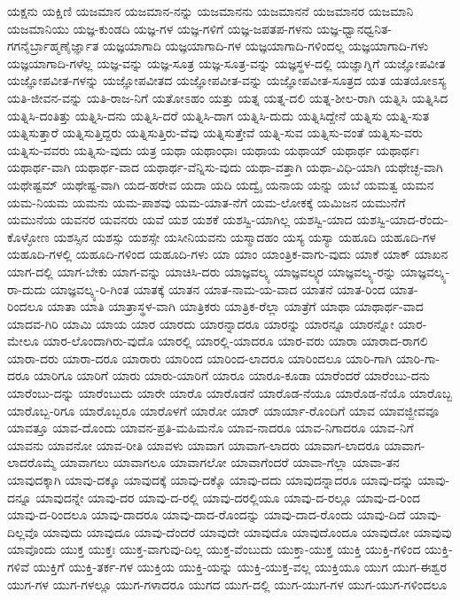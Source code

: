 {ಯಕ್ಷನು
ಯಕ್ಷಿಣಿ
ಯಜಮಾನ
ಯಜಮಾನ-ನನ್ನು
ಯಜಮಾನನು
ಯಜಮಾನನೆ
ಯಜಮಾನರ
ಯಜಮಾನಿ
ಯಜಮಾನಿಯು
ಯಜ್ಞ-ಕುಂಡದಿ
ಯಜ್ಞ-ಗಳ
ಯಜ್ಞ-ಗಳಿಗೆ
ಯಜ್ಞ-ಜಪತಪ-ಗಳನು
ಯಜ್ಞ-ಧ್ವಾನಧ್ವನಿತ-ಗಗನೈರ್ಬ್ರಾಹ್ಮಣೈರ್ಜ್ಞಾತ
ಯಜ್ಞಯಾಗಾದಿ
ಯಜ್ಞಯಾಗಾದಿ-ಗಳ
ಯಜ್ಞಯಾಗಾದಿ-ಗಳಿಂದಲ್ಲ
ಯಜ್ಞಯಾಗಾದಿ-ಗಳು
ಯಜ್ಞಯಾಗಾದಿ-ಗಳೆಲ್ಲ
ಯಜ್ಞ-ವನ್ನು
ಯಜ್ಞ-ಸೂತ್ರ
ಯಜ್ಞ-ಸೂತ್ರ-ವನ್ನು
ಯಜ್ಞಸ್ಥಳ-ದಲ್ಲಿ
ಯಜ್ಞಾಗ್ನಿಗೆ
ಯಜ್ಞೋಪವೀತ
ಯಜ್ಞೋಪವೀತ-ಗಳನ್ನು
ಯಜ್ಞೋಪವೀತದ
ಯಜ್ಞೋಪವೀತ-ವನ್ನು
ಯಜ್ಞೋಪವೀತ-ಸೂತ್ರದ
ಯತ
ಯತಯೋಽಸ್ಯ
ಯತಿ-ಜೀವನ-ವನ್ನು
ಯತಿ-ರಾಜ-ನಿಗೆ
ಯತೋಽಹಂ
ಯತ್ತು
ಯತ್ನ
ಯತ್ನ-ದಲಿ
ಯತ್ನ-ಶೀಲ-ರಾಗಿ
ಯತ್ನಿಸಿ
ಯತ್ನಿಸಿದ
ಯತ್ನಿಸಿ-ದಂತಿತ್ತು
ಯತ್ನಿಸಿ-ದನು
ಯತ್ನಿಸಿ-ದರೆ
ಯತ್ನಿಸಿ-ದಾಗ
ಯತ್ನಿಸಿ-ದುದು
ಯತ್ನಿಸಿದ್ದೇನೆ
ಯತ್ನಿಸು
ಯತ್ನಿ-ಸುತ
ಯತ್ನಿಸುತ್ತಾರೆ
ಯತ್ನಿಸುತ್ತಿದ್ದರು
ಯತ್ನಿಸುತ್ತಿರು-ವೆವು
ಯತ್ನಿಸುತ್ತೇವೆ
ಯತ್ನಿ-ಸುವ
ಯತ್ನಿಸು-ವಂತೆ
ಯತ್ನಿಸು-ವರು
ಯತ್ನಿಸು-ವವರು
ಯತ್ನಿಸು-ವುದು
ಯತ್ರ
ಯಥಾ
ಯಥಾಂಧಾಃ
ಯಥಾಯ
ಯಥಾಯ್
ಯಥಾರ್ಥ
ಯಥಾರ್ಥಃ
ಯಥಾರ್ಥ-ವಾಗಿ
ಯಥಾರ್ಥ-ವಾದ
ಯಥಾರ್ಥ-ವೆನ್ನಿಸು-ವುದು
ಯಥಾ-ವತ್ತಾಗಿ
ಯಥಾ-ವಿಧಿ-ಯಾಗಿ
ಯಥೇಚ್ಛ-ವಾಗಿ
ಯಥೇಷ್ಟಮ್
ಯಥೇಷ್ಟ-ವಾಗಿ
ಯದ-ಹರೇವ
ಯದಾ
ಯದಿ
ಯದ್ವೈ
ಯನಾಯ
ಯನ್ನು
ಯಬೆ
ಯಮತ್ವ
ಯಮನ
ಯಮ-ನಿಯಮ
ಯಮನು
ಯಮ-ಪಾಶವು
ಯಮ-ಯಾತ-ನೆಗೆ
ಯಮ-ಲೋಕಕ್ಕೆ
ಯಮಿಜನ
ಯಮುನೆಗೆ
ಯಮುನೆಯ
ಯವನರ
ಯವನರು
ಯವೆ
ಯಶ
ಯಶಕೆ
ಯಶಸ್ವಿ-ಯಾಗಿಲ್ಲ
ಯಶಸ್ವಿ-ಯಾದ
ಯಶಸ್ವಿ-ಯಾದ-ರೆಂದು-ಕೊಳ್ಳೋಣ
ಯಶಸ್ಸಿನ
ಯಶಸ್ಸು
ಯಶಸ್ಸೇ
ಯಸೀನಿಯವನು
ಯಸ್ಮಾದಹಂ
ಯಸ್ಯ
ಯಸ್ಯಾ
ಯಹೂದಿ
ಯಹೂದಿ-ಗಳ
ಯಹೂದಿ-ಗಳಲ್ಲಿ
ಯಹೂದಿ-ಗಳಿಂದ
ಯಹೂದಿ-ಗಳು
ಯಾ
ಯಾಂ
ಯಾಂತ್ರಿಕ-ವಾಗು-ವುದು
ಯಾಕೆ
ಯಾಕ್
ಯಾಖನ
ಯಾಗ-ದಲ್ಲಿ
ಯಾಗ-ಬೇಕು
ಯಾಗ-ವನ್ನು
ಯಾಚಿಸಿ-ದರು
ಯಾಜ್ಞವಲ್ಕ್ಯ
ಯಾಜ್ಞವಲ್ಕ್ಯರ
ಯಾಜ್ಞವಲ್ಕ್ಯ-ರನ್ನು
ಯಾಜ್ಞವಲ್ಕ್ಯ-ರಾ-ದುದು
ಯಾಜ್ಞವಲ್ಕ್ಯ-ರಿ-ಗಿಂತ
ಯಾತಕ್ಕೆ
ಯಾತನ
ಯಾತ-ನಾಮ-ಯ-ವಾದ
ಯಾತನೆ
ಯಾತ-ರಿಂದ
ಯಾತ-ರಿಂದಲೂ
ಯಾತಾ
ಯಾತಿ
ಯಾತ್ರಾಸ್ಥಳ-ವಾಗಿ
ಯಾತ್ರಿಕರು
ಯಾತ್ರಿಕ-ರೆಲ್ಲಾ
ಯಾತ್ರೆಗೆ
ಯಾಥಾ
ಯಾಥಾರ್ಥ-ವಾದ
ಯಾದವ-ಗಿರಿ
ಯಾಮಿ
ಯಾಯ
ಯಾರ
ಯಾರದು
ಯಾರನ್ನಾದರೂ
ಯಾರನ್ನು
ಯಾರನ್ನೂ
ಯಾರನ್ನೋ
ಯಾರ-ಮೇಲೂ
ಯಾರ-ಲೊಂದಾಗಿರು-ವುದೊ
ಯಾರಲ್ಲಿ
ಯಾರಲ್ಲಿ-ಯಾದರೂ
ಯಾರ-ವರು
ಯಾರಾ
ಯಾರಾದ-ರಾಗಲಿ
ಯಾರಾ-ದರು
ಯಾರಾ-ದರೂ
ಯಾರಾರು
ಯಾರಿಂದ
ಯಾರಿಂದ-ಲಾದರೂ
ಯಾರಿಂದಲೂ
ಯಾರಿ-ಗಾಗಿ
ಯಾರಿ-ಗಾ-ದರೂ
ಯಾರಿಗೂ
ಯಾರಿಗೆ
ಯಾರು
ಯಾರು-ಯಾರಿಗೆ
ಯಾರೂ
ಯಾರೂ-ಕೂಡಾ
ಯಾರೆಂದರೆ
ಯಾರೆಂಬು-ದನು
ಯಾರೆಂಬು-ದನ್ನು
ಯಾರೆಂಬುದು
ಯಾರೇ
ಯಾರೊ
ಯಾರೊಡನೆ
ಯಾರೊಡ-ನೆಯೂ
ಯಾರೊಡ-ನೆಯೊ
ಯಾರೊಬ್ಬ
ಯಾರೊಬ್ಬ-ರಿಗೂ
ಯಾರೊಬ್ಬರೂ
ಯಾರೊಳಗೆ
ಯಾರೋ
ಯಾರ್
ಯಾರ್ಯಾ-ರೊಂದಿಗೆ
ಯಾವ
ಯಾವಜ್ಜೀವವೂ
ಯಾವತ್ತೂ
ಯಾವ-ದೊಂದು
ಯಾವನ-ಪ್ರತಿ-ಮಹಿಮನೊ
ಯಾವ-ನಾದರೂ
ಯಾವ-ನಿಗಾದರೂ
ಯಾವ-ನಿಗೆ
ಯಾವನು
ಯಾವನೋ
ಯಾವ-ರೀತಿ
ಯಾವಳು
ಯಾವಾಗ
ಯಾವಾಗ-ಲಾದರು
ಯಾವಾಗ-ಲಾದರೂ
ಯಾವಾಗ-ಲಾದರೊಮ್ಮೆ
ಯಾವಾಗಲು
ಯಾವಾಗಲೂ
ಯಾವಾಗಲೋ
ಯಾವಾಗೆಂದರೆ
ಯಾವಾ-ಗೆಲ್ಲಾ
ಯಾವಾ-ತನ
ಯಾವುದಕ್ಕಾಗಿ
ಯಾವು-ದಕ್ಕೂ
ಯಾವುದಕ್ಕೆ
ಯಾವು-ದಕ್ಕೊ
ಯಾವು-ದದು
ಯಾವುದನ್ನಾದರೂ
ಯಾವು-ದನ್ನು
ಯಾವು-ದನ್ನೂ
ಯಾವುದನ್ನೇ
ಯಾವು-ದರ
ಯಾವು-ದ-ರಲ್ಲಿ
ಯಾವು-ದರಲ್ಲಿಯೂ
ಯಾವು-ದ-ರಲ್ಲೂ
ಯಾವು-ದ-ರಿಂದ
ಯಾವು-ದ-ರಿಂದಲೂ
ಯಾವು-ದಾದರೂ
ಯಾವು-ದಾದ-ರೊಂದನ್ನು
ಯಾವು-ದಾದ-ರೊಂದು
ಯಾವು-ದಿದೆ
ಯಾವು-ದಿಲ್ಲವೊ
ಯಾವುದು
ಯಾವುದೂ
ಯಾವು-ದೆಂದರೆ
ಯಾವುದೇ
ಯಾವುದೊ
ಯಾವುದೊಂದೂ
ಯಾವುದೋ
ಯಾವುವು
ಯಾವೊಂದು
ಯುಕ್ತ
ಯುಕ್ತಃ
ಯುಕ್ತ-ವಾಗುವು-ದಿಲ್ಲ
ಯುಕ್ತ-ವೆಂಬುದು
ಯುಕ್ತಾ-ಯುಕ್ತ
ಯುಕ್ತಿ
ಯುಕ್ತಿ-ಗಳಿಂದ
ಯುಕ್ತಿ-ಗಳಿವೆ
ಯುಕ್ತಿಗೆ
ಯುಕ್ತಿ-ತರ್ಕ-ಗಳ
ಯುಕ್ತಿಯ
ಯುಕ್ತಿ-ಯನ್ನು
ಯುಕ್ತಿ-ಯುಕ್ತ-ವಲ್ಲ
ಯುಕ್ತಿಯೂ
ಯುಗ
ಯುಗ-ಈಶ್ವರ
ಯುಗ-ಗಳ
ಯುಗ-ಗಳಲ್ಲೂ
ಯುಗ-ಗಳಾದರೂ
ಯುಗದ
ಯುಗ-ದಲ್ಲಿ
ಯುಗ-ಯುಗ-ಗಳ
ಯುಗ-ಯುಗ-ಗಳಿಂದಲೂ
}
